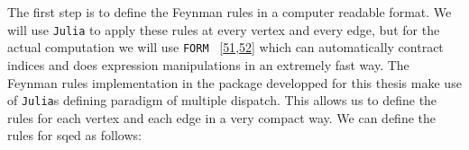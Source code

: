 \documentclass[
  10pt,
  a4paper,
  DIV=11,
  numbers=noendperiod,
  twoside]{scrreprt}
\newenvironment{Shaded}{\begin{snugshade}}{\end{snugshade}}
\newcommand{\DataTypeTok}[1]{\textcolor[rgb]{0.68,0.00,0.00}{#1}}
\newcommand{\FunctionTok}[1]{\textcolor[rgb]{0.28,0.35,0.67}{#1}}
\newcommand{\KeywordTok}[1]{\textcolor[rgb]{0.00,0.23,0.31}{#1}}
\newcommand{\NormalTok}[1]{\textcolor[rgb]{0.00,0.23,0.31}{#1}}
\newcommand{\OperatorTok}[1]{\textcolor[rgb]{0.37,0.37,0.37}{#1}}
\newcommand{\PreprocessorTok}[1]{\textcolor[rgb]{0.68,0.00,0.00}{#1}}
\newcommand{\SpecialCharTok}[1]{\textcolor[rgb]{0.37,0.37,0.37}{#1}}
\newcommand{\StringTok}[1]{\textcolor[rgb]{0.13,0.47,0.30}{#1}}
\DeclareRobustCommand{\[}{\begin{equation}}
\DeclareRobustCommand{\]}{\end{equation}}
\begin{document}
The first step is to define the Feynman rules in a computer readable
format. We will use \texttt{Julia} to apply these rules at every vertex
and every edge, but for the actual computation we will use \texttt{FORM}
~{[}\protect\hyperlink{ref-Vermaseren:2000nd}{51},\protect\hyperlink{ref-Kuipers:2012rf}{52}{]}
which can automatically contract indices and does expression
manipulations in an extremely fast way. The Feynman rules implementation
in the package developped for this thesis make use of \texttt{Julia}s
defining paradigm of multiple dispatch. This allows us to define the
rules for each vertex and each edge in a very compact way. We can define
the rules for \gls{sqed} as follows:

\begin{Shaded}
\end{Shaded}
\end{document}
